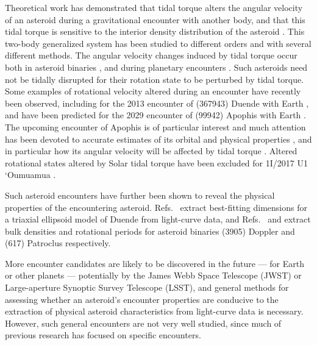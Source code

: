 \documentclass[fleqn,usenatbib]{mnras}
\begin{document}
Theoretical work has demonstrated that tidal torque alters the angular velocity of an asteroid during a gravitational encounter with another body, and that this tidal torque is sensitive to the interior density distribution of the asteroid \cite{paul88, SCHEERES2000106, ashenberg07, BOUE2009750, HouMar2017}. This two-body generalized system has been studied to different orders and with several different methods. The angular velocity changes induced by tidal torque occur both in asteroid binaries \cite{Naidu_2015, Makarov2022ChaosOO}, and during planetary encounters \cite{RICHARDSON199847, scheeres2004evolution}. Such asteroids need not be tidally disrupted for their rotation state to be perturbed by tidal torque. Some examples of rotational velocity altered during an encounter have recently been observed, including for the 2013 encounter of (367943) Duende with Earth \cite{MOSKOVITZ2020113519, benson2020spin}, and have been predicted for the 2029 encounter of (99942) Apophis with Earth \cite{SCHEERES2005281, DEMARTINI201993}. The upcoming encounter of Apophis is of particular interest and much attention has been devoted to accurate estimates of its orbital and physical properties \cite{yu2014numerical, hirabayashi2021finite,valvano2022apophis, Lee2022Apophis}, and in particular how its angular velocity will be affected by tidal torque \cite{souchay2014rotational, souchay2018changes}. Altered rotational states altered by Solar tidal torque have been excluded for 1I/2017 U1 `Oumuamua \cite{KWIECINSKI2018170}. 


Such asteroid encounters have further been shown to reveal the physical properties of the encountering asteroid. Refs.~\cite{MOSKOVITZ2020113519, benson2020spin} extract best-fitting dimensions for a triaxial ellipsoid model of Duende from light-curve data, and Refs.~\cite{DESCAMPS2020113726} and \cite{BERTHIER2020113990} extract bulk densities and rotational periods for asteroid binaries (3905) Doppler and (617) Patroclus respectively.

More encounter candidates are likely to be discovered in the future --- for Earth or other planets --- potentially by the James Webb Space Telescope (JWST) or Large-aperture Synoptic Survey Telescope (LSST), and general methods for assessing whether an asteroid's encounter properties are conducive to the extraction of physical asteroid characteristics from light-curve data is necessary. However, such general encounters are not very well studied, since much of previous research has focused on specific encounters.
\end{document}
